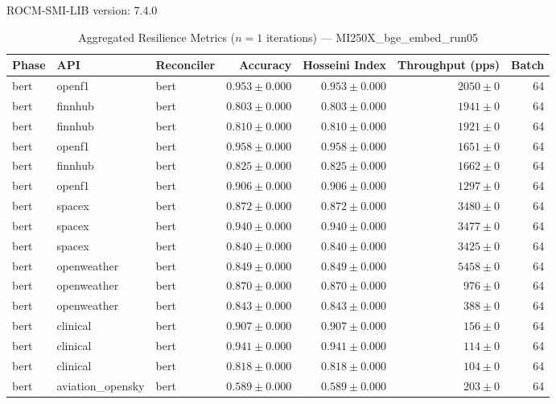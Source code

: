 ROCM-SMI-LIB version: 7.4.0

\begin{table}[htbp]
\caption{Aggregated Resilience Metrics ($n=1$ iterations) --- MI250X_bge_embed_run05}
\begin{tabular}{l l l r r r r}
\hline
Phase & API & Reconciler & Accuracy & Hosseini Index & Throughput (pps) & Batch \\
\hline
bert & openf1 & bert & $0.953\pm0.000$ & $0.953\pm0.000$ & $2050\pm0$ & 64 \\
bert & finnhub & bert & $0.803\pm0.000$ & $0.803\pm0.000$ & $1941\pm0$ & 64 \\
bert & finnhub & bert & $0.810\pm0.000$ & $0.810\pm0.000$ & $1921\pm0$ & 64 \\
bert & openf1 & bert & $0.958\pm0.000$ & $0.958\pm0.000$ & $1651\pm0$ & 64 \\
bert & finnhub & bert & $0.825\pm0.000$ & $0.825\pm0.000$ & $1662\pm0$ & 64 \\
bert & openf1 & bert & $0.906\pm0.000$ & $0.906\pm0.000$ & $1297\pm0$ & 64 \\
bert & spacex & bert & $0.872\pm0.000$ & $0.872\pm0.000$ & $3480\pm0$ & 64 \\
bert & spacex & bert & $0.940\pm0.000$ & $0.940\pm0.000$ & $3477\pm0$ & 64 \\
bert & spacex & bert & $0.840\pm0.000$ & $0.840\pm0.000$ & $3425\pm0$ & 64 \\
bert & openweather & bert & $0.849\pm0.000$ & $0.849\pm0.000$ & $5458\pm0$ & 64 \\
bert & openweather & bert & $0.870\pm0.000$ & $0.870\pm0.000$ & $976\pm0$ & 64 \\
bert & openweather & bert & $0.843\pm0.000$ & $0.843\pm0.000$ & $388\pm0$ & 64 \\
bert & clinical & bert & $0.907\pm0.000$ & $0.907\pm0.000$ & $156\pm0$ & 64 \\
bert & clinical & bert & $0.941\pm0.000$ & $0.941\pm0.000$ & $114\pm0$ & 64 \\
bert & clinical & bert & $0.818\pm0.000$ & $0.818\pm0.000$ & $104\pm0$ & 64 \\
bert & aviation\_opensky & bert & $0.589\pm0.000$ & $0.589\pm0.000$ & $203\pm0$ & 64 \\

\end{tabular}
\end{table}
